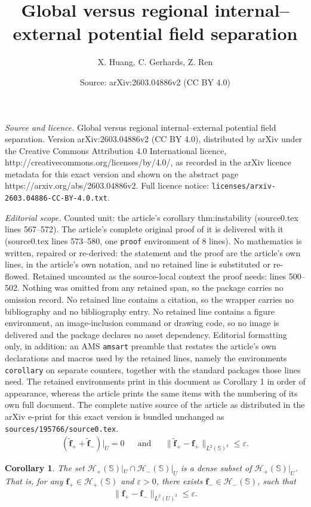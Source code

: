 \documentclass[10pt,a4paper]{amsart}
\title{Global versus regional internal–external potential field separation}
\author{X. Huang, C. Gerhards, Z. Ren}
\date{Source: arXiv:2603.04886v2 (CC BY 4.0)}
\newtheorem{corollary}{Corollary}
\renewcommand{\SS}{\mathbb{S}}
\newcommand{\eps}{\varepsilon}
\newcommand{\f}{\mathbf{f}}
\begin{document}
\maketitle

\noindent\emph{Source and licence.} Global versus regional internal–external potential field separation. Version arXiv:2603.04886v2 (CC BY 4.0), distributed by arXiv under the Creative Commons Attribution 4.0 International licence, http://creativecommons.org/licenses/by/4.0/, as recorded in the arXiv licence metadata for this exact version and shown on the abstract page https://arxiv.org/abs/2603.04886v2. Full licence notice: \texttt{licenses/arxiv-2603.04886-CC-BY-4.0.txt}.\par\smallskip

\noindent\textit{Editorial scope.} Counted unit: the article's corollary thm:instability (source0.tex lines 567--572). The article's complete original proof of it is delivered with it (source0.tex lines 573--580, one \texttt{proof} environment of 8 lines). No mathematics is written, repaired or re-derived: the statement and the proof are the article's own lines, in the article's own notation, and no retained line is substituted or re-flowed.  Retained uncounted as the source-local context the proof needs: lines 500--502.  Nothing was omitted from any retained span, so the package carries no omission record.  No retained line contains a citation, so the wrapper carries no bibliography and no bibliography entry.  No retained line contains a figure environment, an image-inclusion command or drawing code, so no image is delivered and the package declares no asset dependency.  Editorial formatting only, in addition: an AMS \texttt{amsart} preamble that restates the article's own declarations and macros used by the retained lines, namely the environments \texttt{corollary} on separate counters, together with the standard packages those lines need.  The retained environments print in this document as Corollary 1 in order of appearance, whereas the article prints the same items with the numbering of its own full document.  The complete native source of the article as distributed in the arXiv e-print for this exact version is bundled unchanged as \texttt{sources/195766/source0.tex}.
  \begin{align}\label{eqn:desity_1}
      (\tilde{\f}_++\tilde{\f}_-)|_U=0 && \text{and} &&\|\tilde{\f}_+-\f_+\|_{L^2(\SS)^3}\leq \eps.
  \end{align}

\begin{corollary}\label{thm:instability}
The set $\mathcal H_+(\SS)|_{U} \cap \mathcal H_-(\SS)|_{U}$ is a dense subset of $\mathcal H_+(\SS)|_{U}$. That is, for any $\f_+\in\mathcal H_+(\SS)$ and $\eps>0$, there exists $\f_-\in \mathcal H_-(\SS)$, such that
  \begin{align}\label{eqn:desity_2}
      \|\f_+ - \f_-\|_{L^2(U)^3}\leq \eps.
  \end{align}
\end{corollary}
\end{document}

